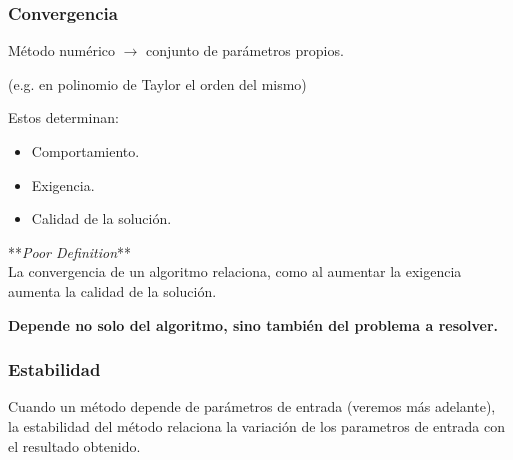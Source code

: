 \documentclass[xcolor=svgnames]{beamer} %
\theoremstyle{plain}
\renewcommand{\textbf}[1]{{\bfseries\textcolor{redUnq2}{#1}}}
\theoremstyle{definition}
\begin{document}
\begin{frame}
	\frametitle{Convergencia}

	Método numérico $\rightarrow$ conjunto de parámetros propios.
	
	(e.g. en polinomio de Taylor el orden del mismo)\vspace{10pt}
	
	Estos determinan:
\begin{itemize}
	\item Comportamiento.
	\item Exigencia.
	\item Calidad de la solución.
\end{itemize}
	 
	 
**\textit{Poor Definition}**\\
La convergencia de un algoritmo relaciona, como al aumentar la exigencia aumenta la calidad de la solución. 

\textbf{Depende no solo del algoritmo, sino también del problema a resolver.}

\end{frame}


\begin{frame}
\frametitle{Estabilidad}
Cuando un método depende de parámetros de entrada (veremos más adelante), \\
la estabilidad del método relaciona la variación de los parametros de entrada con el resultado obtenido.


\end{frame}
\end{document}
